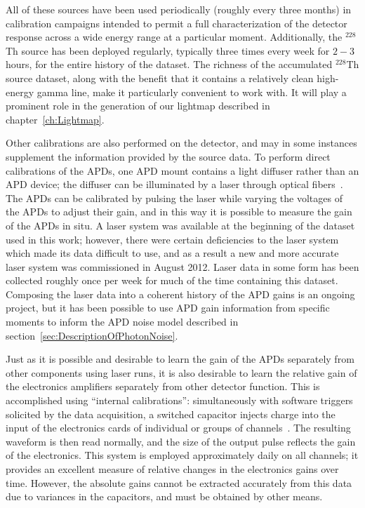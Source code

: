 All of these sources have been used periodically (roughly every three months) in calibration campaigns intended to permit a full characterization of the detector response across a wide energy range at a particular moment.  Additionally, the $^{228}$Th source has been deployed regularly, typically three times every week for $2-3$ hours, for the entire history of the dataset.  The richness of the accumulated $^{228}$Th source dataset, along with the benefit that it contains a relatively clean high-energy gamma line, make it particularly convenient to work with. It will play a prominent role in the generation of our lightmap described in chapter~\ref{ch:Lightmap}.

Other calibrations are also performed on the detector, and may in some instances supplement the information provided by the source data.  To perform direct calibrations of the APDs, one APD mount contains a light diffuser rather than an APD device; the diffuser can be illuminated by a laser through optical fibers~\cite{detectorPartI}.  The APDs can be calibrated by pulsing the laser while varying the voltages of the APDs to adjust their gain, and in this way it is possible to measure the gain of the APDs in situ.  A laser system was available at the beginning of the dataset used in this work; however, there were certain deficiencies to the laser system which made its data difficult to use, and as a result a new and more accurate laser system was commissioned in August 2012.  Laser data in some form has been collected roughly once per week for much of the time containing this dataset.  Composing the laser data into a coherent history of the APD gains is an ongoing project, but it has been possible to use APD gain information from specific moments to inform the APD noise model described in section~\ref{sec:DescriptionOfPhotonNoise}.

Just as it is possible and desirable to learn the gain of the APDs separately from other components using laser runs, it is also desirable to learn the relative gain of the electronics amplifiers separately from other detector function.  This is accomplished using ``internal calibrations'': simultaneously with software triggers solicited by the data acquisition, a switched capacitor injects charge into the input of the electronics cards of individual or groups of channels~\cite{EXOElectronicsFunctionalSpecification}.  The resulting waveform is then read normally, and the size of the output pulse reflects the gain of the electronics.  This system is employed approximately daily on all channels; it provides an excellent measure of relative changes in the electronics gains over time.  However, the absolute gains cannot be extracted accurately from this data due to variances in the capacitors, and must be obtained by other means.

